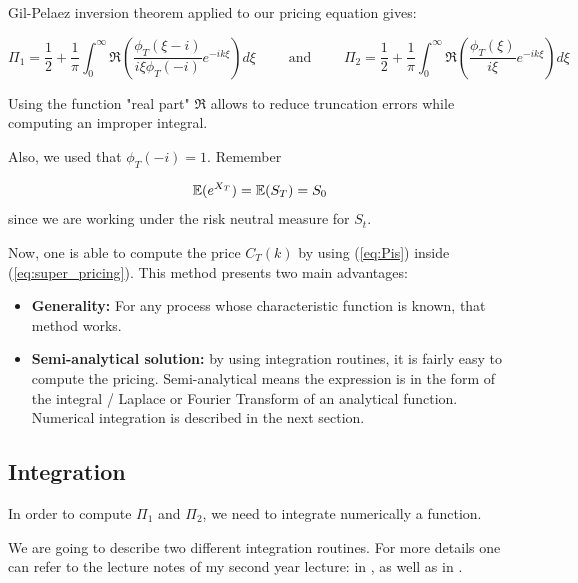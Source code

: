 Gil-Pelaez inversion theorem applied to our pricing equation gives:

\begin{equation}
\label{eq:Pis}
\Pi_1 =  \frac 1 2 + \frac 1 {\pi} \int_0^{\infty} \mathfrak{R} \left ( \frac{ \phi_T ( \xi - i )  }  { i \xi \phi_T(-i) } e^{- i k \xi } \right ) d \xi  \qquad
\text{  and  }  \qquad
\Pi_2 =  \frac 1 2 + \frac {1} {\pi} \int_0^{\infty} \mathfrak{R} \left (  \frac{ \phi_T ( \xi )}    { i \xi } e^{- i k \xi } \right ) d \xi
\end{equation}

Using the function "real part" $ \mathfrak{R} $ allows to reduce truncation errors while computing an improper integral. 

Also, we used that $\phi_T(-i) = 1$. Remember

$$ \mathbb E ( e^{X_T} ) = \mathbb E ( S_T ) = S_0 $$ since we are working under the risk neutral measure for $S_t$.


Now, one is able to compute the price $C_T(k)$ by using (\ref{eq:Pis}) inside (\ref{eq:super_pricing}). This method presents two main advantages:

\begin{itemize}
\item \textbf{Generality:} For any process whose characteristic function is known, that method works.
\item \textbf{Semi-analytical solution:} by using integration routines, it is fairly easy to compute the pricing. Semi-analytical means the expression is in the form of the integral / Laplace or Fourier Transform of an analytical function. Numerical integration is described in the next section. 

\end{itemize}














\subsection{Integration}
\label{integration}

In order to compute $\Pi_1$ and $\Pi_2$, we need to integrate numerically a function. 

We are going to describe two different integration routines. For more details one can refer to the lecture notes of my second year lecture: in \cite{annalisa}, as well as in \cite{num_methods}. 

